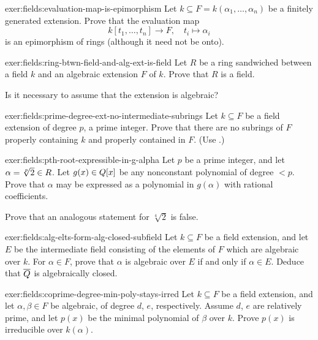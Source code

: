 \begin{exer}{}{exer:fields:evaluation-map-is-epimorphism}
  Let $k \subseteq F = k(\alpha_1, \dots, \alpha_n)$ be a finitely
  generated extension. Prove that the evaluation map
  \[
    k[t_1, \dots, t_n] \to F, \quad t_i \mapsto \alpha_i
  \]
  is an epimorphism of rings (although it need not be onto).
\end{exer}

\begin{exer}{}{exer:fields:ring-btwn-field-and-alg-ext-is-field}
  Let $R$ be a ring sandwiched between a field $k$ and an algebraic
  extension $F$ of $k$. Prove that $R$ is a field.

  Is it necessary to assume that the extension is algebraic?
\end{exer}

\begin{exer}{}{exer:fields:prime-degree-ext-no-intermediate-subrings}
  Let $k \subseteq F$ be a field extension of degree $p$, a prime
  integer.  Prove that there are no subrings of $F$ properly
  containing $k$ and properly contained in $F$. (Use
  .)
\end{exer}

\begin{exer}{}{exer:fields:pth-root-expressible-in-g-alpha}
  Let $p$ be a prime integer, and let $\alpha = \sqrt[p]{2} \in
  R$. Let $g(x) \in Q[x]$ be any nonconstant polynomial of degree
  $< p$. Prove that $\alpha$ may be expressed as a polynomial in
  $g(\alpha)$ with rational coefficients.

  Prove that an analogous statement for $\sqrt[4]{2}$ is false.
\end{exer}

\begin{exer}{}{exer:fields:alg-elts-form-alg-closed-subfield}
  Let $k \subseteq F$ be a field extension, and let $E$ be the
  intermediate field consisting of the elements of $F$ which are
  algebraic over $k$. For $\alpha \in F$, prove that $\alpha$ is
  algebraic over $E$ if and only if $\alpha \in E$. Deduce that
  $\overline{Q}$ is algebraically closed.
\end{exer}

\begin{exer}{}{exer:fields:coprime-degree-min-poly-stays-irred}
  Let $k \subseteq F$ be a field extension, and let
  $\alpha, \beta \in F$ be algebraic, of degree $d$, $e$,
  respectively. Assume $d$, $e$ are relatively prime, and let $p(x)$
  be the minimal polynomial of $\beta$ over $k$. Prove $p(x)$ is
  irreducible over $k(\alpha)$.
\end{exer}

